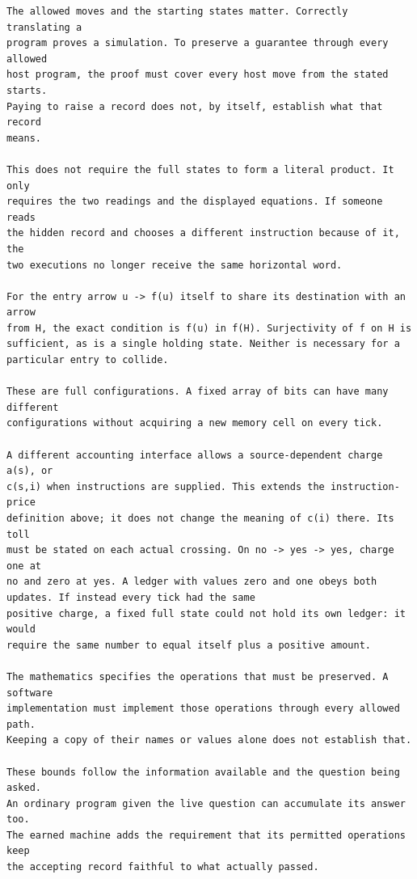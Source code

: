 \documentclass[11pt,twoside]{article}
\theoremstyle{thielethm}
\theoremstyle{thieledef}
\theoremstyle{thieledef}
\theoremstyle{thieledef}
\theoremstyle{thielethm}
\theoremstyle{thieleobs}
\theoremstyle{thielethm}
\begin{document}
\begin{small}
\begin{verbatim}
The allowed moves and the starting states matter. Correctly translating a
program proves a simulation. To preserve a guarantee through every allowed
host program, the proof must cover every host move from the stated starts.
Paying to raise a record does not, by itself, establish what that record
means.

This does not require the full states to form a literal product. It only
requires the two readings and the displayed equations. If someone reads
the hidden record and chooses a different instruction because of it, the
two executions no longer receive the same horizontal word.

For the entry arrow u -> f(u) itself to share its destination with an arrow
from H, the exact condition is f(u) in f(H). Surjectivity of f on H is
sufficient, as is a single holding state. Neither is necessary for a
particular entry to collide.

These are full configurations. A fixed array of bits can have many different
configurations without acquiring a new memory cell on every tick.

A different accounting interface allows a source-dependent charge a(s), or
c(s,i) when instructions are supplied. This extends the instruction-price
definition above; it does not change the meaning of c(i) there. Its toll
must be stated on each actual crossing. On no -> yes -> yes, charge one at
no and zero at yes. A ledger with values zero and one obeys both updates. If instead every tick had the same
positive charge, a fixed full state could not hold its own ledger: it would
require the same number to equal itself plus a positive amount.

The mathematics specifies the operations that must be preserved. A software
implementation must implement those operations through every allowed path.
Keeping a copy of their names or values alone does not establish that.

These bounds follow the information available and the question being asked.
An ordinary program given the live question can accumulate its answer too.
The earned machine adds the requirement that its permitted operations keep
the accepting record faithful to what actually passed.



\end{verbatim}
\end{small}
\end{document}
